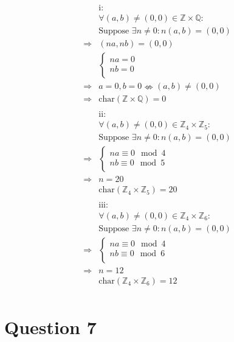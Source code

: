 \documentclass{article}
\begin{document}
\begin{align*}
    &\text{i}:\\
    &\forall(a,b)\ne(0,0)\in \mathbb{Z} \times\mathbb{Q}: \\
    &\text{Suppose }\exists n\ne 0:n(a,b)=(0,0)\\
    \Rightarrow&(na,nb)=(0,0)\\
    &\begin{cases}
        na=0\\
        nb=0\\
    \end{cases}\\
    \Rightarrow&a=0,b=0\nLeftrightarrow (a,b)\ne(0,0)\\
    \Rightarrow&\text{char}(\mathbb{Z} \times\mathbb{Q})=0\\
    &\\
    &\text{ii}:\\
    &\forall(a,b)\ne(0,0)\in \mathbb{Z}_4 \times\mathbb{Z} _5: \\
    &\text{Suppose }\exists n\ne 0:n(a,b)=(0,0)\\
    \Rightarrow&\begin{cases}
        na\equiv 0\mod4\\
        nb\equiv 0\mod 5\\
    \end{cases}\\
    \Rightarrow&n=20\\
    &\text{char}(\mathbb{Z}_4 \times\mathbb{Z} _5)=20\\
    &\\
    &\text{iii}:\\
    &\forall(a,b)\ne(0,0)\in \mathbb{Z}_4 \times\mathbb{Z} _6: \\
    &\text{Suppose }\exists n\ne 0:n(a,b)=(0,0)\\
    \Rightarrow&\begin{cases}
        na\equiv 0\mod4\\
        nb\equiv 0\mod 6\\
    \end{cases}\\
    \Rightarrow&n=12\\
    &\text{char}(\mathbb{Z}_4 \times\mathbb{Z} _6)=12\\
\end{align*}

\newpage

\section*{Question 7}
\end{document}
